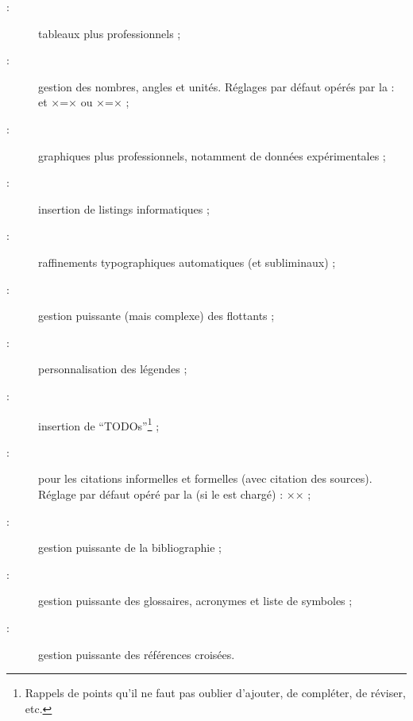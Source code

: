 \begin{description}
\item[ :] tableaux plus professionnels ;
\item[ :] gestion des nombres, angles et unités. Réglages par
  défaut opérés par la \yatcl :  et
  ×=× ou
  ×=×\selonlangue{} ;
\item[ :] graphiques plus professionnels,
  notamment de données expérimentales ;
\item[ :] insertion de listings informatiques ;
\item[ :] raffinements typographiques
  automatiques (et subliminaux) ;
\item[ :] gestion puissante (mais complexe) des
  flottants ;
\item[ :] personnalisation des légendes ;
\item[ :] insertion de
  \foreignquote{english}{TODOs}\footnote{Rappels de points qu'il ne
    faut pas oublier d'ajouter, de compléter, de réviser, etc.} ;
\item[ :] pour les citations informelles et formelles (avec
  citation des sources). Réglage par défaut opéré par la \yatcl (si le
   est chargé) : ×\SetCiteCommand{\autocite}× ;
\item[ :] gestion puissante de la bibliographie ;
\item[ :] gestion puissante des glossaires,
  acronymes et liste de symboles ;
\item[ :] gestion puissante des références croisées.
\end{description}

%
\iffalse
\fi

